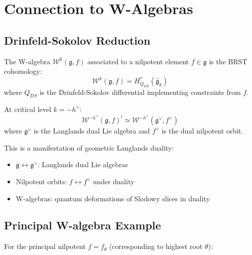 \section{Connection to W-Algebras}

\subsection{Drinfeld-Sokolov Reduction}

\begin{definition}[DS Reduction]
The W-algebra $\mathcal{W}^k(\mathfrak{g}, f)$ associated to a nilpotent element $f \in \mathfrak{g}$ is the BRST cohomology:
\begin{equation}
\mathcal{W}^k(\mathfrak{g}, f) = H^*_{Q_{DS}}(\widehat{\mathfrak{g}}_k)
\end{equation}
where $Q_{DS}$ is the Drinfeld-Sokolov differential implementing constraints from $f$.
\end{definition}

\begin{theorem}\label{thm:w-algebra-koszul}
At critical level $k = -h^\vee$:
\begin{equation}
\mathcal{W}^{-h^\vee}(\mathfrak{g}, f)^! \simeq \mathcal{W}^{-h^\vee}(\mathfrak{g}^\vee, f^\vee)
\end{equation}
where $\mathfrak{g}^\vee$ is the Langlands dual Lie algebra and $f^\vee$ is the dual nilpotent orbit.
\end{theorem}

\begin{remark}
This is a manifestation of geometric Langlands duality:
\begin{itemize}
\item $\mathfrak{g} \leftrightarrow \mathfrak{g}^\vee$: Langlands dual Lie algebras
\item Nilpotent orbits: $f \leftrightarrow f^\vee$ under duality
\item W-algebras: quantum deformations of Slodowy slices in duality
\end{itemize}
\end{remark}

\subsection{Principal W-algebra Example}

For the principal nilpotent $f = f_{\theta}$ (corresponding to highest root $\theta$):

